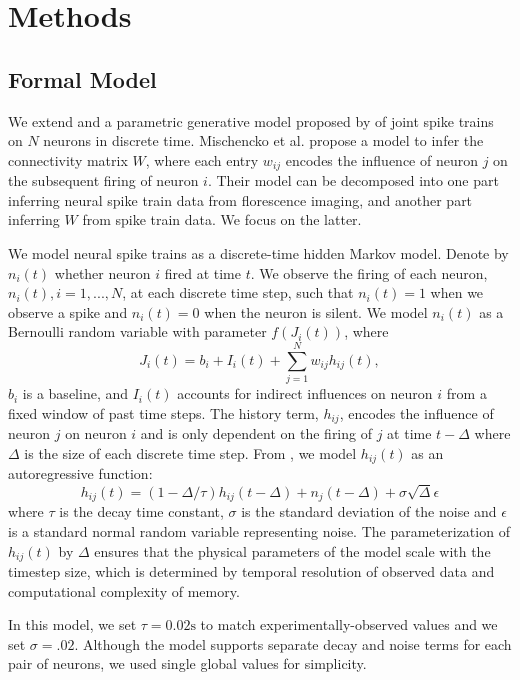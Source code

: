 \documentclass{article}
\begin{document}
\section{Methods}

\subsection{Formal Model}
We extend and a parametric generative model proposed by
\citep{mishchencko2011} of joint spike trains on $N$ neurons in
discrete time. Mischencko et al. propose a model to infer the
connectivity matrix $W$, where each entry $w_{ij}$ encodes the
influence of neuron $j$ on the subsequent firing of neuron $i$. Their
model can be decomposed into one part inferring neural spike train
data from florescence imaging, and another part inferring $W$ from
spike train data. We focus on the latter.

We model neural spike trains as a discrete-time hidden Markov model.
Denote by $ n_i(t) $ whether neuron $i$ fired at time $t$. We observe
the firing of each neuron, $n_i(t), i = 1,...,N$, at each discrete
time step, such that $n_i(t) = 1$ when we observe a spike and $n_i(t)
= 0$ when the neuron is silent. We model $n_i(t)$ as a Bernoulli
random variable with parameter $f(J_i(t))$, where
\begin{equation}
\label{J} J_i(t) = b_i + I_i(t) + \sum_{j=1}^{N} w_{ij}h_{ij}(t),
\end{equation}
$b_i$ is a baseline, and $I_i(t)$ accounts for indirect
influences on neuron $i$ from a fixed window of past time steps.
The history term, $h_{ij}$, encodes the influence of neuron $j$ on
neuron $i$ and is only dependent on the firing of $j$ at time
$t-\Delta$ where $\Delta$ is the size of each discrete time step.
From \citep{mishchencko2011}, we model $h_{ij}(t)$ as an autoregressive
function:
\begin{equation}
\label{h} h_{ij}(t) = (1-\Delta/\tau)h_{ij}(t-\Delta)
  + n_j(t-\Delta)+\sigma\sqrt{\Delta}\epsilon
\end{equation}
where $ \tau$ is the decay time constant, $\sigma$
is the standard deviation of the noise and $\epsilon$ is a
standard normal random variable representing noise.  The parameterization
of $h_{ij}(t)$ by $\Delta$ ensures that the physical parameters of
the model scale with the timestep size, which is determined by
temporal resolution of observed data and computational complexity
of memory.

In this model, we set $\tau = 0.02\text{s}$ to match
experimentally-observed values \citep{mishchencko2011} and we set
$\sigma = .02$. Although the model supports separate decay
and noise terms for each pair of neurons, we used single global
values for simplicity.
\end{document}
